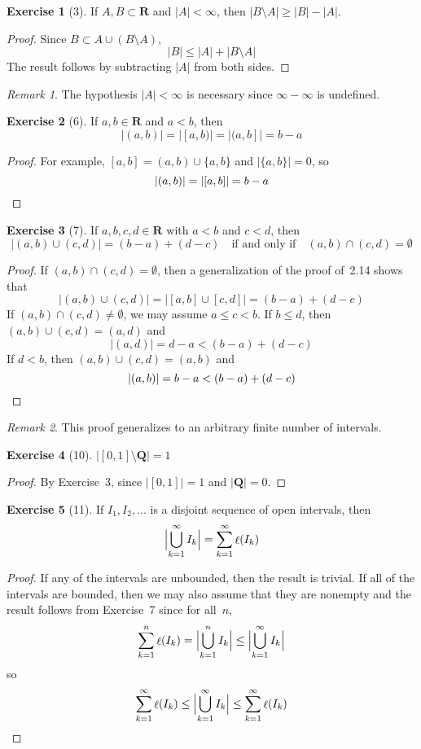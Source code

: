 \documentclass[letterpaper,12pt]{article}
\newcommand{\Q}{\mathbf{Q}}
\newcommand{\R}{\mathbf{R}}
\newcommand{\union}{\cup}
\newcommand{\bigunion}{\bigcup}
\newcommand{\sect}{\cap}
\DeclareMathOperator{\len}{\ell}
\renewcommand{\l}[1]{\len(#1)}
\newcommand{\m}[1]{|#1|}
\newcommand{\bigmeasure}[1]{\Bigl|#1\Bigr|}
\theoremstyle{definition}
\newtheorem*{exer}{Exercise}
\theoremstyle{remark}
\newtheorem*{rmk}{Remark}
\begin{document}
\begin{exer}[3]
If \(A,B\subset\R\) and \(\m{A}<\infty\), then \(\m{B\setminus A}\ge\m{B}-\m{A}\).
\end{exer}
\begin{proof}
Since \(B\subset A\union(B\setminus A)\),
\[\m{B}\le\m{A}+\m{B\setminus A}\]
The result follows by subtracting \(\m{A}\) from both sides.
\end{proof}
\begin{rmk}
The hypothesis \(\m{A}<\infty\) is necessary since \(\infty-\infty\) is undefined.
\end{rmk}

\begin{exer}[6]
If \(a,b\in\R\) and \(a<b\), then
\[\m{(a,b)}=\m{[a,b)}=\m{(a,b]}=b-a\]
\end{exer}
\begin{proof}
For example, \([a,b]=(a,b)\union\{a,b\}\) and \(\m{\{a,b\}}=0\), so
\[\m{(a,b)}=\m{[a,b]}=b-a\qedhere\]
\end{proof}

\begin{exer}[7]
If \(a,b,c,d\in\R\) with \(a<b\) and \(c<d\), then
\[\m{(a,b)\union(c,d)}=(b-a)+(d-c)\quad\text{if and only if}\quad(a,b)\sect(c,d)=\emptyset\]
\end{exer}
\begin{proof}
If \((a,b)\sect(c,d)=\emptyset\), then a generalization of the proof of~2.14 shows that
\[\m{(a,b)\union(c,d)}=\m{[a,b]\union[c,d]}=(b-a)+(d-c)\]
If \((a,b)\sect(c,d)\ne\emptyset\), we may assume \(a\le c<b\). If \(b\le d\), then \((a,b)\union(c,d)=(a,d)\) and
\[\m{(a,d)}=d-a<(b-a)+(d-c)\]
If \(d<b\), then \((a,b)\union(c,d)=(a,b)\) and
\[\m{(a,b)}=b-a<(b-a)+(d-c)\qedhere\]
\end{proof}
\begin{rmk}
This proof generalizes to an arbitrary finite number of intervals.
\end{rmk}

\begin{exer}[10]
\(\m{[0,1]\setminus\Q}=1\)
\end{exer}
\begin{proof}
By Exercise~3, since \(\m{[0,1]}=1\) and \(\m{\Q}=0\).
\end{proof}

\begin{exer}[11]
If \(I_1,I_2,\ldots\) is a disjoint sequence of open intervals, then
\[\bigmeasure{\bigunion_{k=1}^{\infty}I_k}=\sum_{k=1}^{\infty}\l{I_k}\]
\end{exer}
\begin{proof}
If any of the intervals are unbounded, then the result is trivial. If all of the intervals are bounded, then we may also assume that they are nonempty and the result follows from Exercise~7 since for all~\(n\),
\[\sum_{k=1}^n\l{I_k}=\bigmeasure{\bigunion_{k=1}^n I_k}\le\bigmeasure{\bigunion_{k=1}^{\infty}I_k}\]
so
\[\sum_{k=1}^{\infty}\l{I_k}\le\bigmeasure{\bigunion_{k=1}^{\infty}I_k}\le\sum_{k=1}^{\infty}\l{I_k}\qedhere\]
\end{proof}
\end{document}
